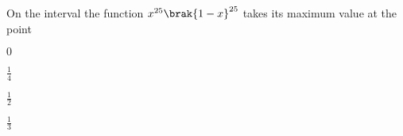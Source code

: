 \item On the interval  the function $x^{25}\brak{1-x}^{25}$
takes its maximum value at the point 

\hfill{}

\begin{enumerate}
\begin{multicols}{4}
	\item $0$ 
	\item $\frac{1}{4}$ 
	\item $\frac{1}{2}$ 
        \item $\frac{1}{3}$
\end{multicols}
\end{enumerate}



